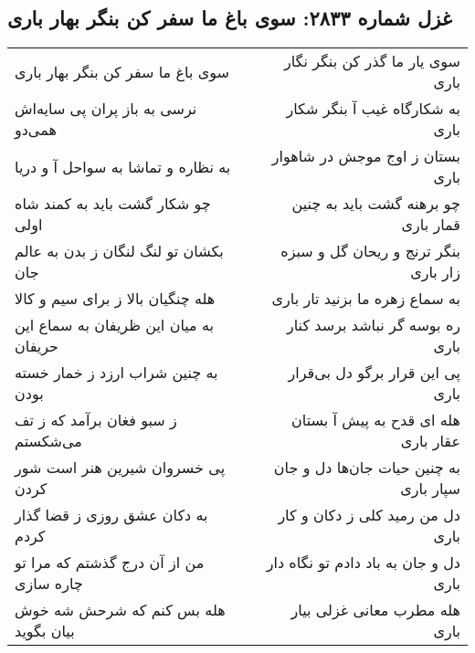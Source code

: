 \begin{center}
\section*{غزل شماره ۲۸۳۳: سوی باغ ما سفر کن بنگر بهار باری}
\label{sec:2833}
\begin{longtable}{l p{0.5cm} r}
سوی باغ ما سفر کن بنگر بهار باری
&&
سوی یار ما گذر کن بنگر نگار باری
\\
نرسی به باز پران پی سایه‌اش همی‌دو
&&
به شکارگاه غیب آ بنگر شکار باری
\\
به نظاره و تماشا به سواحل آ و دریا
&&
بستان ز اوج موجش در شاهوار باری
\\
چو شکار گشت باید به کمند شاه اولی
&&
چو برهنه گشت باید به چنین قمار باری
\\
بکشان تو لنگ لنگان ز بدن به عالم جان
&&
بنگر ترنج و ریحان گل و سبزه زار باری
\\
هله چنگیان بالا ز برای سیم و کالا
&&
به سماع زهره ما بزنید تار باری
\\
به میان این ظریفان به سماع این حریفان
&&
ره بوسه گر نباشد برسد کنار باری
\\
به چنین شراب ارزد ز خمار خسته بودن
&&
پی این قرار برگو دل بی‌قرار باری
\\
ز سبو فغان برآمد که ز تف می‌شکستم
&&
هله ای قدح به پیش آ بستان عقار باری
\\
پی خسروان شیرین هنر است شور کردن
&&
به چنین حیات جان‌ها دل و جان سپار باری
\\
به دکان عشق روزی ز قضا گذار کردم
&&
دل من رمید کلی ز دکان و کار باری
\\
من از آن درج گذشتم که مرا تو چاره سازی
&&
دل و جان به باد دادم تو نگاه دار باری
\\
هله بس کنم که شرحش شه خوش بیان بگوید
&&
هله مطرب معانی غزلی بیار باری
\\
\end{longtable}
\end{center}

